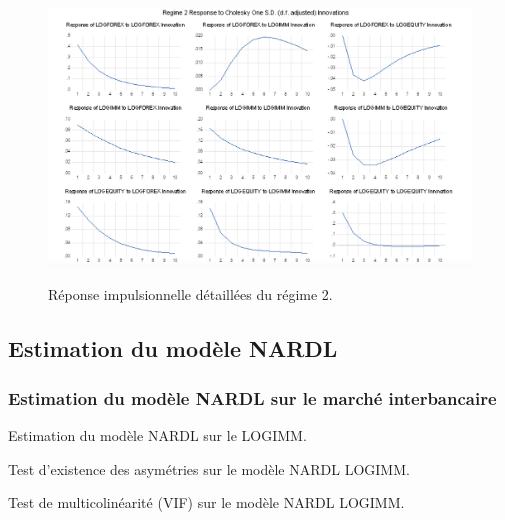 \begin{figure}[H]
    \centering
    \caption{Réponse impulsionnelle détaillées du régime 2.}
    \includegraphics[scale=0.65]{annexes/regime2_multiples_reponses.png}
    \label{fig:msih_resids}
\end{figure}

\subsection{Estimation du modèle NARDL}

\subsubsection{Estimation du modèle NARDL sur le marché interbancaire}

\begin{table}[H]
    \centering
    \sffamily
    \caption{Estimation du modèle NARDL sur le LOGIMM.}
    \label{tab:nardl_logimm}
    \resizebox{1\textwidth}{!}{}
\end{table}

\begin{table}[H]
    \centering
    \sffamily
    \caption{Test d'existence des asymétries sur le modèle NARDL LOGIMM.}
    \label{tab:asymetrie_nardl_logimm}
    \resizebox{0.8\textwidth}{!}{}
\end{table}

\begin{table}[H]
    \centering
    \sffamily
    \caption{Test de multicolinéarité (VIF) sur le modèle NARDL LOGIMM.}
    \label{tab:vif_nardl_logimm}
    \resizebox{0.8\textwidth}{!}{}
\end{table}


